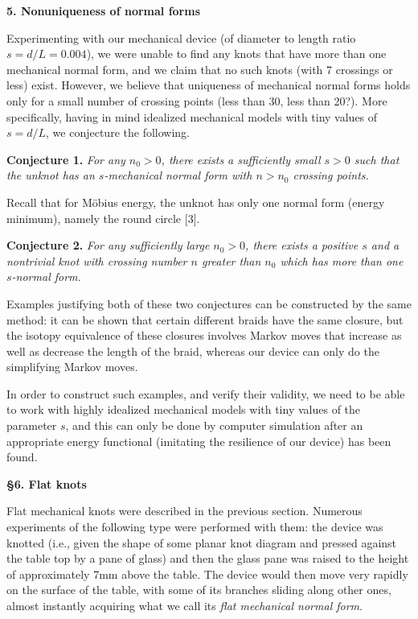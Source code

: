 \documentclass[12pt]{book}
\begin{document}
\bigskip 
{\bf  5. Nonuniqueness of normal forms}  

\smallskip
Experimenting with our mechanical device (of diameter to length ratio $s=d/L=0.004$), we were unable to find any knots that have more than one mechanical normal form, and we claim that no such knots (with 7 crossings or less) exist. However, we believe that uniqueness of mechanical normal forms holds only for a small number of crossing points (less than 30, less than 20?). More specifically, having in mind idealized mechanical models with tiny values of $s=d/L$, we conjecture the following. 

\smallskip 
{\bf Conjecture 1.} {\sl For any $n_0>0$, there exists a sufficiently small $s>0$ such that the unknot has an $s$-mechanical normal form with $n>n_0$ crossing points.}

\smallskip
Recall that for M\"obius energy, the unknot has only one normal form (energy minimum), namely the round circle [3]. 

\smallskip 
{\bf Conjecture 2.} {\sl For any sufficiently large $n_0>0$, there exists a positive $s$ and a nontrivial knot with crossing number $n$ greater than $n_0$ which has more than one $s$-normal form.}

\smallskip
Examples justifying both of these two conjectures can be constructed by the same method: it can be shown that certain different braids have the same closure, but the isotopy equivalence of these closures involves Markov moves that increase as well as decrease the length of the braid, whereas our device can only do the simplifying Markov moves.   

In order to construct such examples, and verify their validity, we need to be able to work with highly idealized mechanical models with tiny values of the parameter $s$, and this can only be done by computer simulation after an appropriate energy functional (imitating the resilience of our device) has been found.  

\pagebreak
{\bf \S 6. Flat knots}  

\smallskip
Flat mechanical knots were described in the previous section. Numerous experiments of the following type were performed with them: the device was knotted (i.e., given the shape of some planar knot diagram and pressed against the table top by a pane of glass) and then the glass pane was raised to the height of approximately 7mm above the table. The device would then move very rapidly on the surface of the table, with some of its branches sliding along other ones, almost instantly acquiring what we call its {\it flat mechanical normal form}.
\end{document}
